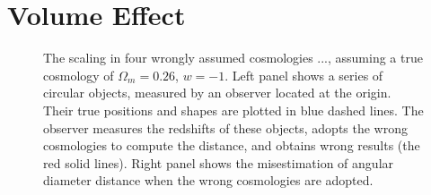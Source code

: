 \documentclass[iop]{emulateapj}
\begin{document}
\section{Volume Effect}
\label{sec:Voleffect}

\begin{figure}
   \caption{\label{fig_xyquan}
   The scaling in four wrongly assumed cosmologies ..., %
   assuming a true cosmology of $\Omega_m=0.26$, $w=-1$.
   Left panel shows a series of circular objects, measured by an observer located at the origin.
   Their true positions and shapes are plotted in blue dashed lines.
   The observer measures the redshifts of these objects, adopts the wrong cosmologies to compute the distance,
   and obtains wrong results (the red solid lines).
   Right panel shows the misestimation of angular diameter distance when the wrong cosmologies are adopted.
   }
\end{figure}
\end{document}
